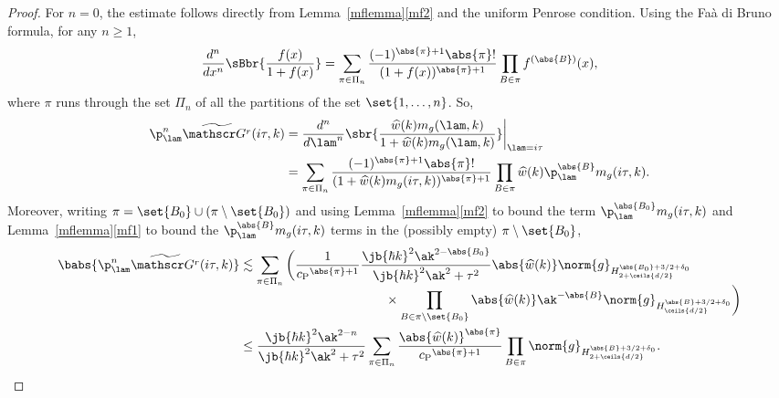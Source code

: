 \begin{proof}
For $n=0$, the estimate follows directly from Lemma~\ref{mflemma}\eqref{mf2} and the uniform Penrose condition. Using the Faà di Bruno formula, for any $n\geq 1$,
\begin{align*}
\frac{d^n}{dx^n}\sBbr{\frac{f(x)}{1+f(x)}}=\sum_{\pi\in\Pi_n}\frac{(-1)^{\abs{\pi}+1}\abs{\pi}!}{(1+f(x))^{\abs{\pi}+1}}\prod_{B\in\pi}f^{(\abs{B})}(x),
\end{align*}where $\pi$ runs through the set $\Pi_n$ of all the partitions of the set $\set{1,\ldots,n}$. So,
\begin{align*}
\p_\lam^n\widetilde {\mathscr G^r}(i\tau,k)&=\frac{d^n}{d\lam^n}\sbr{\frac{\widehat w(k)m_g(\lam,k)}{1+\widehat w(k)m_g(\lam,k)}}\bigg|_{\lam=i\tau}\\
&=\sum_{\pi\in\Pi_n}\frac{(-1)^{\abs{\pi}+1}\abs{\pi}!}{(1+\widehat w(k)m_g(i\tau,k))^{\abs{\pi}+1}}\prod_{B\in\pi}\widehat w(k)\p^{\abs{B}}_\lam m_g(i\tau,k).
\end{align*}
Moreover, writing $\pi=\set{B_0}\cup(\pi\setminus \set{B_0})$ and using Lemma~\ref{mflemma}\eqref{mf2} to bound the term $\p_\lam^{\abs{B_0}}m_g(i\tau,k)$ and Lemma~\ref{mflemma}\eqref{mf1} to bound the $\p^{\abs{B}}_\lam m_g(i\tau,k)$ terms in the (possibly empty) $\pi\setminus\set{B_0}$,
\begin{align*}
\babs{\p_\lam^n\widetilde {\mathscr G^r}(i\tau,k)}&\lesssim\sum_{\pi\in\Pi_n}\bigg(\frac{1}{{c_{\mathrm{P}}}^{\abs{\pi}+1}}\frac{\jb{\hbar k}^2\ak^{2-\abs{B_0}}}{\jb{\hbar k}^2\ak^2+\tau^2}\abs{\widehat w(k)}\norm{g}_{H^{\abs{B_0}+3/2+\delta_0}_{2+\ceils{d/2}}}\\[-5pt]
&\hspace{4cm}\times\prod_{B\in \pi\setminus\set{B_0}}\abs{\widehat w(k)}\ak^{-\abs{B}}\norm{g}_{H^{\abs{B}+3/2+\delta_0}_{\ceils{d/2}}}\bigg)\\
&\leq\frac{\jb{\hbar k}^2\ak^{2-n}}{\jb{\hbar k}^2\ak^2+\tau^2}\sum_{\pi\in \Pi_n}\frac{\abs{\widehat w(k)}^{\abs{\pi}}}{{c_{\mathrm{P}}}^{\abs{\pi}+1}}\prod_{B\in\pi}\norm{g}_{H^{\abs{B}+3/2+\delta_0}_{2+\ceils{d/2}}}.\qedhere
\end{align*}
\end{proof}

